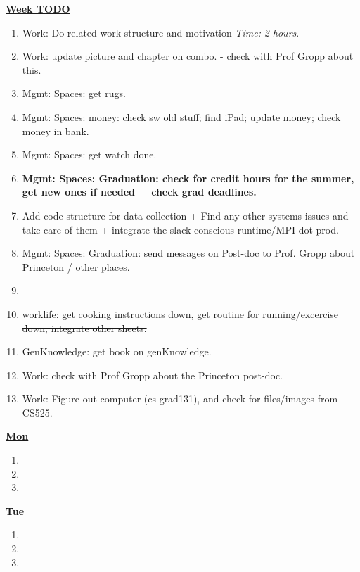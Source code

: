 \documentclass[serif,mathserif,final]{beamer}
\newcommand{\doneTask}[1]{\item \sout{#1}}
\newcommand{\timeEst}[1]{\textit{Time:} \textit{#1}}
\begin{document}
\begin{frame}{}
\begin{columns}[t]
\begin{column}{0.33\linewidth}{\textbf{\underline{Week TODO}}}
\begin{block}
\begin{enumerate}
\item \tiny Work: Do related work structure and motivation \timeEst{2
  hours}. 

\item \tiny Work: update picture and chapter on combo. - check with
  Prof Gropp about this. 

\item \tiny Mgmt: Spaces: get rugs. 

\item \tiny Mgmt: Spaces: money: check sw old stuff; find iPad; update money; check money in bank. 

\item \tiny Mgmt: Spaces: get watch done. 

\item \tiny \textbf{Mgmt: Spaces: Graduation: check for credit hours 
for the summer, get new ones if needed + check grad deadlines.} 

\item \tiny Add code structure for data collection + Find
  any other systems issues and take care of them + integrate the
  slack-conscious runtime/MPI dot prod. 

\item \tiny Mgmt: Spaces: Graduation: send messages on Post-doc to
  Prof. Gropp about Princeton / other places. 
\item \tiny \doneTask{worklife: get cooking instructions down, get
  routine for running/excercise down, integrate other sheets.}

\item \tiny GenKnowledge: get book on genKnowledge. 
\item \tiny Work: check with Prof Gropp about the Princeton post-doc. 
\item \tiny Work: Figure out computer (cs-grad131), and check for files/images from CS525. 

\end{enumerate}
\end{block} 

\begin{block} 

\textbf{\underline{Mon}}
\begin{enumerate} 
\tiny \item \tiny 
\item \tiny 
\item \tiny 
\end{enumerate} 


\textbf{\underline{Tue}}
\begin{enumerate} 
\tiny \item \tiny 
\item \tiny 
\item \tiny 
\end{enumerate} 



\end{block}
\end{column}
\end{columns}
\end{frame}
\end{document}
